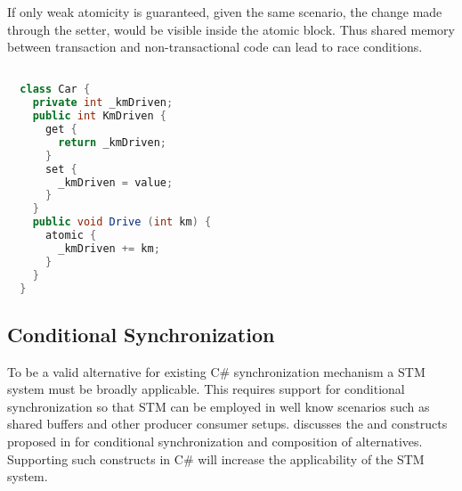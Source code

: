 If only weak atomicity is guaranteed, given the same scenario, the change made through the setter, would be visible inside the atomic block. Thus shared memory between transaction and non-transactional code can lead to race conditions.
%

\begin{lstlisting}[label=lst:atomicity,
  caption={Level of Atomicity},
  language=Java,  
  showspaces=false,
  showtabs=false,
  breaklines=true,
  showstringspaces=false,
  breakatwhitespace=true,
  commentstyle=\color{greencomments},
  keywordstyle=\color{bluekeywords},
  stringstyle=\color{redstrings},
  morekeywords={atomic, retry, orElse, var, get, set}]  % Start your code-block

  class Car {
    private int _kmDriven;
    public int KmDriven {
      get {
        return _kmDriven;
      }
      set {
        _kmDriven = value;
      }
    }
    public void Drive (int km) {
      atomic {
        _kmDriven += km;
      }
    }
  }
\end{lstlisting}

%
%

\subsection{Conditional Synchronization}
To be a valid alternative for existing C\# synchronization mechanism a \ac{STM} system must be broadly applicable. This requires support for conditional synchronization so that \ac{STM} can be employed in well know scenarios such as shared buffers and other producer consumer setups\cite[p. 128]{tanenbaum2008modern}.  discusses the  and  constructs proposed in \cite{harris2005composable} for conditional synchronization and composition of alternatives. Supporting such constructs in C\# will increase the applicability of the \ac{STM} system.

